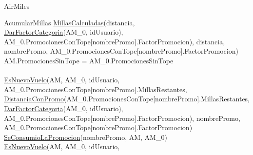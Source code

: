 \documentclass[11pt,a4paper]{article}
\begin{document}
\begin{tad}{AirMiles}
\begin{proc}{AcumularMillas}
{{{					\hyperref[sec:MillasCalculadas]{MillasCalculadas}(distancia, \\ \hyperref[sec:DarFactorCategoria]{DarFactorCategoria}(AM_0, idUsuario), \\
					AM_0.PromocionesConTope[nombrePromo].FactorPromocion), distancia, \\
					nombrePromo, AM_0.PromocionesConTope[nombrePromo].FactorPromocion) \land
					 \land \\
					AM.PromocionesSinTope = AM_0.PromocionesSinTope
				}{
					\\
					 \\
					\hyperref[sec:EsNuevoVuelo]{EsNuevoVuelo}(AM, AM_0, idUsuario, \\
					AM_0.PromocionesConTope[nombrePromo].MillasRestantes, \\
					\hyperref[sec:DistanciaConPromo]{DistanciaConPromo}(AM_0.PromocionesConTope[nombrePromo].MillasRestantes, \\
					\hyperref[sec:DarFactorCategoria]{DarFactorCategoria}(AM_0, idUsuario), \\
					AM_0.PromocionesConTope[nombrePromo].FactorPromocion),
					nombrePromo, \\ AM_0.PromocionesConTope[nombrePromo].FactorPromocion) \land \\
					\hyperref[sec:SeConsumioLaPromocion]{SeConsumioLaPromocion}(nombrePromo, AM, AM_0) \land \\
					\hyperref[sec:EsNuevoVuelo]{EsNuevoVuelo}(AM, AM_0, idUsuario, \\
}}}
\end{proc}
\end{tad}
\end{document}

